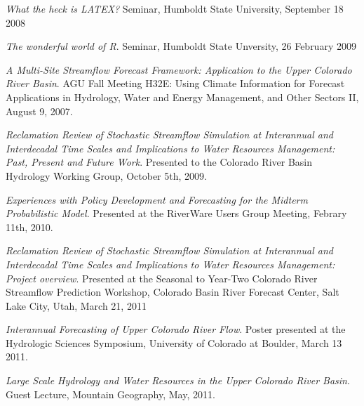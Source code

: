 \documentclass[10pt,a4paper]{scrartcl}
\begin{document}
\begin{cv}{}
        \begin{cvlist}{}\label{pres}
            \item \textit{ What the heck is LATEX?} Seminar, Humboldt State University, September 18 2008
            \item \textit{ The wonderful world of R}. Seminar, Humboldt State Unversity, 26 February 2009
            \item \textit{ A Multi-Site Streamflow Forecast Framework: Application to the Upper Colorado River Basin}. AGU Fall Meeting H32E: Using Climate Information for Forecast Applications in Hydrology, Water and Energy Management, and Other Sectors II, August 9, 2007.
            \item \textit{ Reclamation Review of Stochastic Streamflow Simulation at Interannual and Interdecadal Time Scales and Implications to Water Resources Management: Past, Present and Future Work}. Presented to the Colorado River Basin Hydrology Working Group, October 5th, 2009. 
            \item \textit{ Experiences with Policy Development and Forecasting for the Midterm Probabilistic Model}. Presented at the RiverWare Users Group Meeting, Febrary 11th, 2010. 
            \item \textit{ Reclamation Review of Stochastic Streamflow Simulation at Interannual and Interdecadal Time Scales and Implications to Water Resources Management: Project overview}. Presented at the Seasonal to Year-Two Colorado River Streamflow Prediction Workshop, Colorado Basin River Forecast Center, Salt Lake City, Utah, March 21, 2011
            \item \textit{ Interannual Forecasting of Upper Colorado River Flow}. Poster presented at the Hydrologic Sciences Symposium, University of Colorado at Boulder, March 13 2011. 
            \item \textit{ Large Scale Hydrology and Water Resources in the Upper Colorado River Basin}. Guest Lecture, Mountain Geography, May, 2011.

        \end{cvlist}
    \end{cv}
\end{document}
